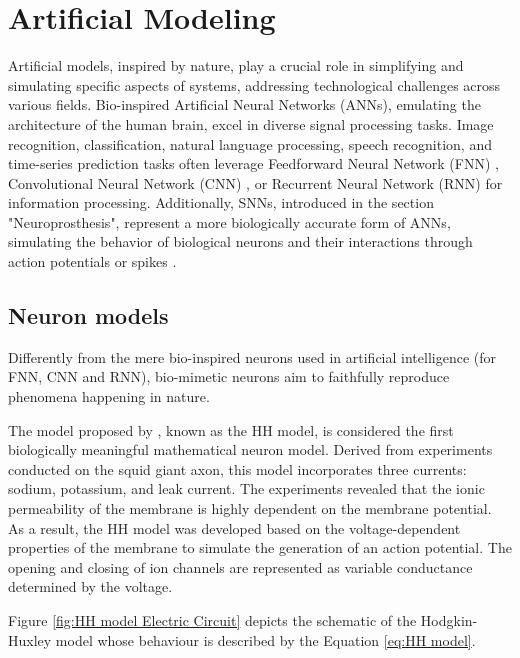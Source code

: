 \section{Artificial Modeling}

Artificial models, inspired by nature, play a crucial role in simplifying and simulating specific aspects of systems, addressing technological challenges across various fields. Bio-inspired Artificial Neural Networks (ANNs), emulating the architecture of the human brain, excel in diverse signal processing tasks. Image recognition, classification, natural language processing, speech recognition, and time-series prediction tasks often leverage Feedforward Neural Network (FNN) \cite{Svozil1997}, Convolutional Neural Network (CNN) \cite{O'SheaNash2015}, or Recurrent Neural Network (RNN) \cite{MedskerJain1999} for information processing. Additionally, SNNs, introduced in the section "Neuroprosthesis", represent a more biologically accurate form of ANNs, simulating the behavior of biological neurons and their interactions through action potentials or spikes \cite{Ghosh-DastidarAdeli2009}.

\subsection{Neuron models}

Differently from the mere bio-inspired neurons used in artificial intelligence (for FNN, CNN and RNN), bio-mimetic neurons aim to faithfully reproduce phenomena happening in nature.

The model proposed by \cite{HodgkinHuxley1990}, known as the HH model, is considered the first biologically meaningful mathematical neuron model. Derived from experiments conducted on the squid giant axon, this model incorporates three currents: sodium, potassium, and leak current. The experiments revealed that the ionic permeability of the membrane is highly dependent on the membrane potential. As a result, the HH model was developed based on the voltage-dependent properties of the membrane to simulate the generation of an action potential. The opening and closing of ion channels are represented as variable conductance determined by the voltage.

Figure \ref{fig:HH model Electric Circuit} depicts the schematic of the Hodgkin-Huxley model whose behaviour is described by the Equation \ref{eq:HH model}.

